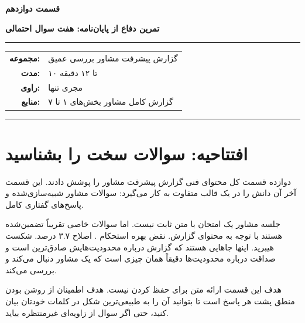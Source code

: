 \documentclass[12pt, a4paper]{article}
\newcommand{\dash}{\lr{---}}
\begin{document}

\thispagestyle{empty}

\vspace*{1.2cm}

{\centering
{\color{seriesblue}\fontsize{24}{30}\selectfont\bfseries قسمت دوازدهم}

\vspace{0.5cm}
{\fontsize{15}{20}\selectfont\bfseries تمرين دفاع از پايان‌نامه: هفت سوال احتمالی}

\vspace{0.9cm}
{\color{seriesblue}\rule{0.55\linewidth}{1pt}}
\vspace{0.7cm}

{\normalsize
\begin{tabular}{rl}
  \textbf{مجموعه:}     & گزارش پيشرفت مشاور \dash{} بررسی عمیق \\[5pt]
  \textbf{مدت:}        & ۱۰ تا ۱۲ دقیقه \\[5pt]
  \textbf{راوی:}       & مجری تنها \\[5pt]
  \textbf{منابع:}      & گزارش کامل مشاور \dash{} بخش‌های ۱ تا ۷ \\
\end{tabular}
}

\vspace{0.9cm}
{\color{seriesblue}\rule{0.55\linewidth}{0.4pt}}
\par}

\vspace{1.2cm}

\section{افتتاحیه: سوالات سخت را بشناسيد}

دوازده قسمت کل محتوای فنی گزارش پيشرفت مشاور را پوشش دادند. اين قسمت آخر آن دانش را در يک قالب متفاوت به کار می‌گيرد: سوالات مشاور شبيه‌سازی‌شده و پاسخ‌های گفتاری کامل.

جلسه مشاور يک امتحان با متن ثابت نيست. اما سوالات خاصی تقريباً تضمين‌شده هستند با توجه به محتوای گزارش. نقض بهره استحکام . اصلاح ۳.۷ درصد. شکست هيبريد. اينها جاهايی هستند که گزارش درباره محدوديت‌هايش صادق‌ترين است \dash{} و صداقت درباره محدوديت‌ها دقيقاً همان چيزی است که يک مشاور دنبال می‌کند و بررسی می‌کند.

هدف اين قسمت ارائه متن برای حفظ کردن نيست. هدف اطمينان از روشن بودن منطق پشت هر پاسخ است تا بتوانيد آن را به طبيعی‌ترين شکل در کلمات خودتان بيان کنيد، حتی اگر سوال از زاويه‌ای غيرمنتظره بيايد.
\end{document}
